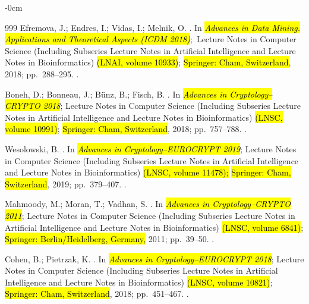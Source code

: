 \documentclass[mathematics,article,accept,pdftex,moreauthors]{Definitions/mdpi}
\begin{document}
\begin{adjustwidth}{-\extralength}{0cm}
\begin{thebibliography}{999}
Efremova, J.; Endres, I.; Vidas, I.; Melnik, O.
.
\newblock In \emph{\hl{Advances in Data Mining. Applications and Theoretical Aspects
(ICDM 2018)}};~{Lecture Notes in Computer Science (Including Subseries Lecture
  Notes in Artificial Intelligence and Lecture Notes in Bioinformatics)} \hl{(LNAI, volume 10933)}; \hl{Springer: Cham, Switzerland}, 2018; pp.~288--295.
.

Boneh, D.; Bonneau, J.; B{\"{u}}nz, B.; Fisch, B.
.
\newblock In \emph{\hl{Advances in Cryptology--CRYPTO 2018}}; {Lecture Notes in Computer Science (Including Subseries Lecture
  Notes in Artificial Intelligence and Lecture Notes in Bioinformatics)} \hl{(LNSC, volume 10991)}; \hl{Springer: Cham, Switzerland}, 2018; pp.~757--788.
.

Wesolowski, B.
.
\newblock In \emph{\hl{Advances in Cryptology--EUROCRYPT 2019}}; {Lecture Notes in Computer Science (Including Subseries Lecture
  Notes in Artificial Intelligence and Lecture Notes in Bioinformatics)} \hl{(LNSC, volume 11478);} \hl{Springer: Cham, Switzerland}, 2019; pp.~379--407.
.



Mahmoody, M.; Moran, T.; Vadhan, S.
.
\newblock In \emph{\hl{Advances in Cryptology–CRYPTO 2011}}; {Lecture Notes in Computer Science (Including Subseries Lecture
  Notes in Artificial Intelligence and Lecture Notes in Bioinformatics)} \hl{(LNSC, volume 6841)}; \hl{Springer: Berlin/Heidelberg, Germany,} 2011; pp.~39--50.
.



Cohen, B.; Pietrzak, K.
.
\newblock In \emph{\hl{Advances in Cryptology--EUROCRYPT 2018}}; {Lecture Notes in Computer Science (Including Subseries Lecture
  Notes in Artificial Intelligence and Lecture Notes in Bioinformatics)} \hl{(LNSC, volume 10821)}; \hl{Springer: Cham, Switzerland}, 2018; pp.~451--467.
.




\end{thebibliography}
\end{adjustwidth}
\end{document}
